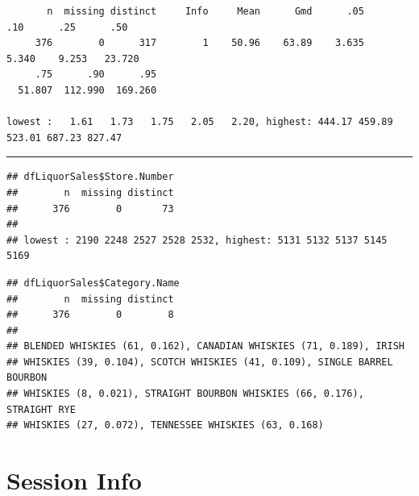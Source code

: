 \documentclass[]{elsarticle} %
\newenvironment{Shaded}{\begin{snugshade}}{\end{snugshade}}
\newcommand{\KeywordTok}[1]{\textcolor[rgb]{0.13,0.29,0.53}{\textbf{{#1}}}}
\newcommand{\NormalTok}[1]{{#1}}
\begin{document}
\begin{spacing}{0.7}
{{\smaller
\begin{verbatim}
       n  missing distinct     Info     Mean      Gmd      .05      .10      .25      .50 
     376        0      317        1    50.96    63.89    3.635    5.340    9.253   23.720 
     .75      .90      .95 
  51.807  112.990  169.260 

lowest :   1.61   1.73   1.75   2.05   2.20, highest: 444.17 459.89 523.01 687.23 827.47
\end{verbatim}
}
\smallskip\hrule\smallskip
}\end{spacing}

\begin{Shaded}
\end{Shaded}

\begin{verbatim}
## dfLiquorSales$Store.Number 
##        n  missing distinct 
##      376        0       73 
## 
## lowest : 2190 2248 2527 2528 2532, highest: 5131 5132 5137 5145 5169
\end{verbatim}

\begin{Shaded}
\end{Shaded}

\begin{verbatim}
## dfLiquorSales$Category.Name 
##        n  missing distinct 
##      376        0        8 
## 
## BLENDED WHISKIES (61, 0.162), CANADIAN WHISKIES (71, 0.189), IRISH
## WHISKIES (39, 0.104), SCOTCH WHISKIES (41, 0.109), SINGLE BARREL BOURBON
## WHISKIES (8, 0.021), STRAIGHT BOURBON WHISKIES (66, 0.176), STRAIGHT RYE
## WHISKIES (27, 0.072), TENNESSEE WHISKIES (63, 0.168)
\end{verbatim}

\section{Session Info}\label{session-info}
\end{document}
